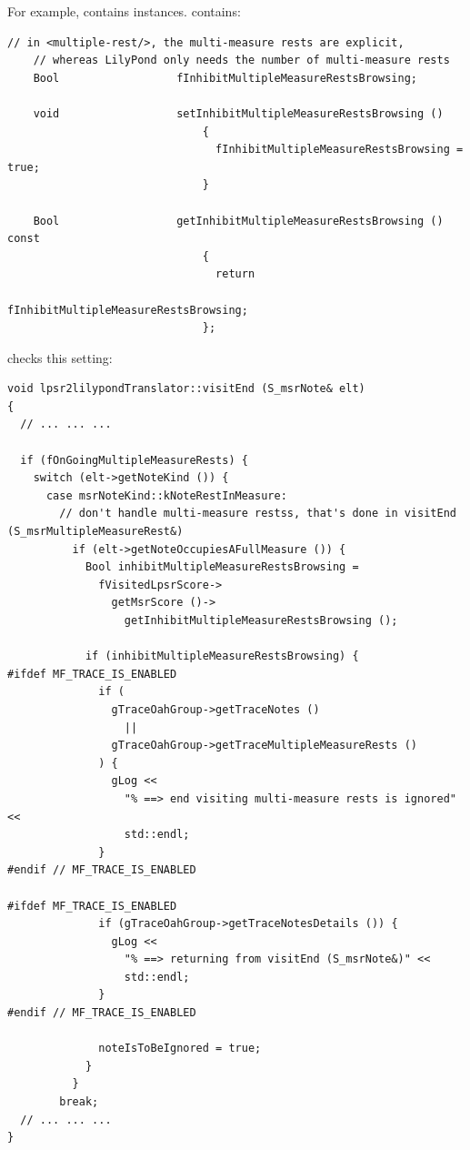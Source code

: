 For example,  contains  instances.  contains:
\begin{lstlisting}[language=CPlusPlus]
    // in <multiple-rest/>, the multi-measure rests are explicit,
    // whereas LilyPond only needs the number of multi-measure rests
    Bool                  fInhibitMultipleMeasureRestsBrowsing;

    void                  setInhibitMultipleMeasureRestsBrowsing ()
                              {
                                fInhibitMultipleMeasureRestsBrowsing = true;
                              }

    Bool                  getInhibitMultipleMeasureRestsBrowsing () const
                              {
                                return
                                  fInhibitMultipleMeasureRestsBrowsing;
                              };
\end{lstlisting}

 checks this setting:
\begin{lstlisting}[language=CPlusPlus]
void lpsr2lilypondTranslator::visitEnd (S_msrNote& elt)
{
  // ... ... ...

  if (fOnGoingMultipleMeasureRests) {
    switch (elt->getNoteKind ()) {
      case msrNoteKind::kNoteRestInMeasure:
        // don't handle multi-measure restss, that's done in visitEnd (S_msrMultipleMeasureRest&)
          if (elt->getNoteOccupiesAFullMeasure ()) {
            Bool inhibitMultipleMeasureRestsBrowsing =
              fVisitedLpsrScore->
                getMsrScore ()->
                  getInhibitMultipleMeasureRestsBrowsing ();

            if (inhibitMultipleMeasureRestsBrowsing) {
#ifdef MF_TRACE_IS_ENABLED
              if (
                gTraceOahGroup->getTraceNotes ()
                  ||
                gTraceOahGroup->getTraceMultipleMeasureRests ()
              ) {
                gLog <<
                  "% ==> end visiting multi-measure rests is ignored" <<
                  std::endl;
              }
#endif // MF_TRACE_IS_ENABLED

#ifdef MF_TRACE_IS_ENABLED
              if (gTraceOahGroup->getTraceNotesDetails ()) {
                gLog <<
                  "% ==> returning from visitEnd (S_msrNote&)" <<
                  std::endl;
              }
#endif // MF_TRACE_IS_ENABLED

              noteIsToBeIgnored = true;
            }
          }
        break;
  // ... ... ...
}
\end{lstlisting}


